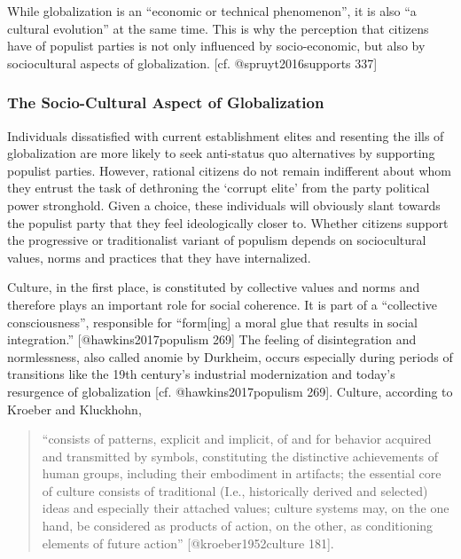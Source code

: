 \documentclass[]{article}
\begin{document}
While globalization is an ``economic or technical phenomenon'', it is
also ``a cultural evolution'' at the same time. This is why the
perception that citizens have of populist parties is not only influenced
by socio-economic, but also by sociocultural aspects of globalization.
{[}cf. @spruyt2016supports 337{]}

\subsubsection*{The Socio-Cultural Aspect of
Globalization}\label{the-socio-cultural-aspect-of-globalization}

Individuals dissatisfied with current establishment elites and resenting
the ills of globalization are more likely to seek anti-status quo
alternatives by supporting populist parties. However, rational citizens
do not remain indifferent about whom they entrust the task of dethroning
the `corrupt elite' from the party political power stronghold. Given a
choice, these individuals will obviously slant towards the populist
party that they feel ideologically closer to. Whether citizens support
the progressive or traditionalist variant of populism depends on
sociocultural values, norms and practices that they have internalized.

Culture, in the first place, is constituted by collective values and
norms and therefore plays an important role for social coherence. It is
part of a ``collective consciousness'', responsible for ``form{[}ing{]}
a moral glue that results in social integration.''
{[}@hawkins2017populism 269{]} The feeling of disintegration and
normlessness, also called anomie by Durkheim, occurs especially during
periods of transitions like the 19th century's industrial modernization
and today's resurgence of globalization {[}cf. @hawkins2017populism
269{]}. Culture, according to Kroeber and Kluckhohn,

\begin{quote}
``consists of patterns, explicit and implicit, of and for behavior
acquired and transmitted by symbols, constituting the distinctive
achievements of human groups, including their embodiment in artifacts;
the essential core of culture consists of traditional (I.e.,
historically derived and selected) ideas and especially their attached
values; culture systems may, on the one hand, be considered as products
of action, on the other, as conditioning elements of future action''
{[}@kroeber1952culture 181{]}.
\end{quote}
\end{document}
